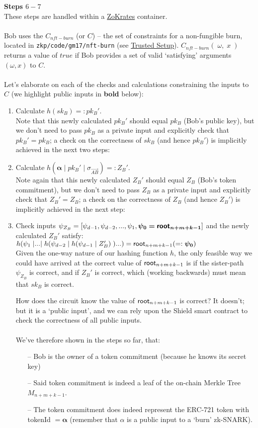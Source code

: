 \textbf{Steps $6 - 7$}
\ \\
These steps are handled within a \hyperref[sec:zokrates]{ZoKrates} container.\\
\\
Bob uses the $C_{nft-burn}$ (or $C$) -- the set of constraints for a non-fungible burn, located in \texttt{zkp/code/gm17/nft-burn} (see \hyperref[sec:trustedSetup]{Trusted Setup}). $C_{nft-burn}(\;\omega,\;x\;)$ returns a value of $true$ if Bob provides a set of valid `satisfying' arguments $(\omega, x)$ to $C$.\\
\\
Let's elaborate on each of the checks and calculations constraining the inputs to $C$ (we highlight public inputs in \textbf{bold} below):
\begin{enumerate}
  \item Calculate $h(sk_B) =: pk_B'$.\\
    Note that this newly calculated $pk_B'$ should equal $pk_B$ (Bob's public key), but we don't need to pass $pk_B$ as a private input and explicitly check that $pk_B'=pk_B$; a check on the correctness of $sk_B$ (and hence $pk_B'$) is implicitly achieved in the next two steps:
  \item Calculate $h(\bm{\alpha}\;|\;pk_B'\;|\;\sigma_{\vec{AB}}) =: Z_B'$.\\
    Note again that this newly calculated $Z_B'$ should equal $Z_B$ (Bob's token commitment), but we don't need to pass $Z_B$ as a private input and explicitly check that $Z_B'=Z_B$; a check on the correctness of $Z_B$ (and hence $Z_B'$) is implicitly achieved in the next step:
  \item Check inputs $\psi_{Z_B}=[\psi_{d-1}, \psi_{d-2},..., \psi_{1}, \bm{\psi_{0}=\mathsf{root}_{n+m+k-1}}]$ and the newly calculated $Z_B'$ satisfy:\\
    $h\br*{\psi_{1}\;|...|\;h\br*{\psi_{d-2}\;|\;h\br*{\psi_{d-1}\;|\;Z_B'}\;}...} = \roott_{n+m+k-1} ( =: \bm{\psi_{0}})$\\
    Given the one-way nature of our hashing function $h$, the only feasible way we could have arrived at the correct value of $\mathsf{root}_{n+m+k-1}$ is if the sister-path $\psi_{Z_B}$ is correct, and if $Z_B'$ is correct, which (working backwards) must mean that $sk_B$ is correct.

    How does the circuit know the value of $\mathsf{root}_{n+m+k-1}$ is correct? It doesn't; but it is a `public input', and we can rely upon the Shield smart contract to check the correctness of all public inputs.\\
  \\
  We've therefore shown in the steps so far, that:
  \begin{itemize}
    \item[--] Bob is the owner of a token commitment (because he knows its secret key)
    \item[--] Said token commitment is indeed a leaf of the on-chain Merkle Tree $M_{n+m+k-1}$.
    \item[--] The token commitment does indeed represent the ERC-721 token with tokenId $=\bm{\alpha}$ (remember that $\alpha$ is a public input to a `burn' zk-SNARK).
  \end{itemize}


\end{enumerate}
